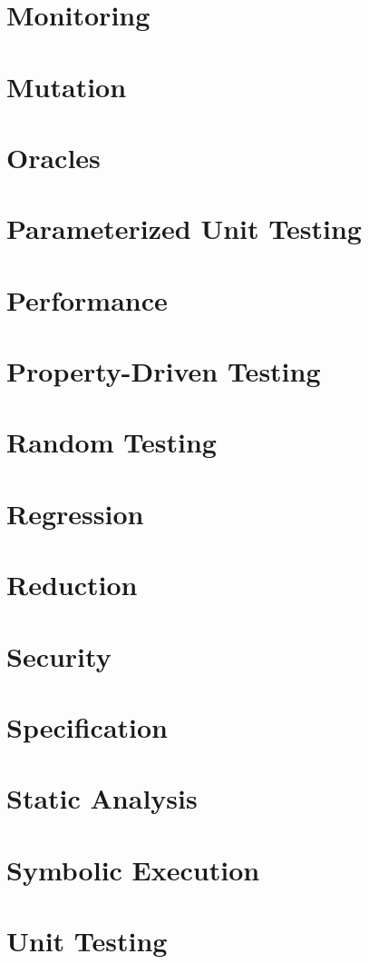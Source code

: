 \chapter{Monitoring}

\chapter{Mutation}

\chapter{Oracles}

\chapter{Parameterized Unit Testing}

\chapter{Performance}

\chapter{Property-Driven Testing}

\chapter{Random Testing}

\chapter{Regression}

\chapter{Reduction}

\chapter{Security}

\chapter{Specification}

\chapter{Static Analysis}

\chapter{Symbolic Execution}

\chapter{Unit Testing}

